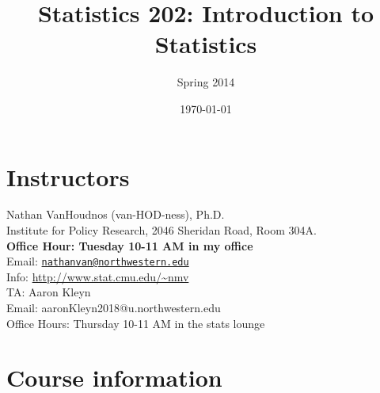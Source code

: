 \documentclass[10pt]{article}
\title{Statistics 202: Introduction to Statistics}
\author{Spring 2014}
\date{\today}
\begin{document}
\maketitle

\section*{Instructors}
Nathan VanHoudnos (van-HOD-ness), Ph.D. \\
Institute for Policy Research, 2046 Sheridan Road, Room 304A. \\
{\bfseries Office Hour: Tuesday 10-11 AM in my office}  \\
Email: \href{mailto:nathanvan@northwestern.edu}{\nolinkurl{nathanvan@northwestern.edu} }\\
Info: \url{http://www.stat.cmu.edu/~nmv} \\

\noindent TA: Aaron Kleyn \\
Email: aaronKleyn2018@u.northwestern.edu \\
Office Hours: Thursday 10-11 AM in the stats lounge 

\section*{Course information}
\end{document}
